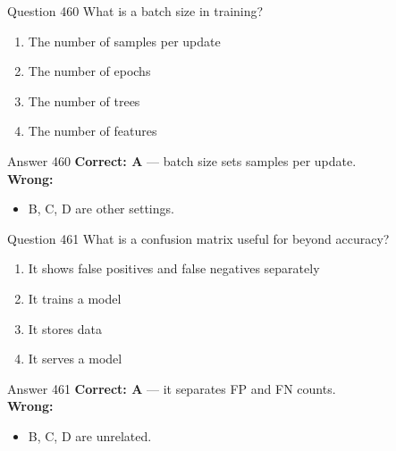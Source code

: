 \documentclass[aspectratio=169,11pt]{beamer}
\begin{document}
	\begin{frame}{Question 460}
		What is a batch size in training?
		\begin{enumerate}[label=\Alph*.]
			\item The number of samples per update
			\item The number of epochs
			\item The number of trees
			\item The number of features
		\end{enumerate}
	\end{frame}
	\begin{frame}{Answer 460}
		\textbf{Correct: A} --- batch size sets samples per update.\\
		\vspace{0.5em}
		\textbf{Wrong:}
		\begin{itemize}
			\item B, C, D are other settings.
		\end{itemize}
	\end{frame}
	
	\begin{frame}{Question 461}
		What is a confusion matrix useful for beyond accuracy?
		\begin{enumerate}[label=\Alph*.]
			\item It shows false positives and false negatives separately
			\item It trains a model
			\item It stores data
			\item It serves a model
		\end{enumerate}
	\end{frame}
	\begin{frame}{Answer 461}
		\textbf{Correct: A} --- it separates FP and FN counts.\\
		\vspace{0.5em}
		\textbf{Wrong:}
		\begin{itemize}
			\item B, C, D are unrelated.
		\end{itemize}
	\end{frame}
	
\end{document}
